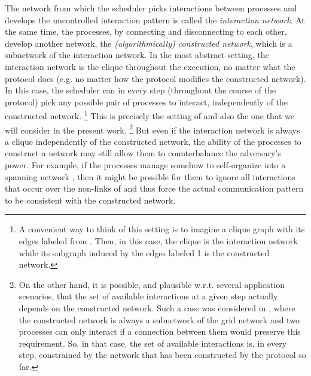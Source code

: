 \documentclass[preprint]{elsarticle}
\begin{document}
The network from which the scheduler picks interactions between processes and develops the uncontrolled interaction pattern is called the \emph{interaction network}. At the same time, the processes, by connecting and disconnecting to each other, develop another network, the \emph{(algorithmically) constructed network}, which is a subnetwork of the interaction network. In the most abstract setting, the interaction network is the clique  throughout the execution, no matter what the protocol does (e.g. no matter how the protocol modifies the constructed network). In this case, the scheduler can in every step (throughout the course of the protocol) pick any possible pair of processes to interact, independently of the constructed network. \footnote{A convenient way to think of this setting is to imagine a clique graph with its edges labeled from . Then, in this case, the clique is the interaction network while its subgraph induced by the edges labeled 1 is the constructed network.} This is precisely the setting of \cite{MS14} and also the one that we will consider in the present work. \footnote{On the other hand, it is possible, and plausible w.r.t. several application scenarios, that the set of available interactions at a given step actually depends on the constructed network. Such a case was considered in \cite{Mi15}, where the constructed network is always a subnetwork of the grid network and two processes can only interact if a connection between them would preserve this requirement. So, in that case, the set of available interactions is, in every step, constrained by the network that has been constructed by the protocol so far.} But even if the interaction network is always a clique independently of the constructed network, the ability of the processes to construct a network may still allow them to counterbalance the adversary's power. For example, if the processes manage somehow to self-organize into a spanning network , then it might be possible for them to ignore all interactions that occur over the non-links of  and thus force the actual communication pattern to be consistent with the constructed network.
\end{document}
